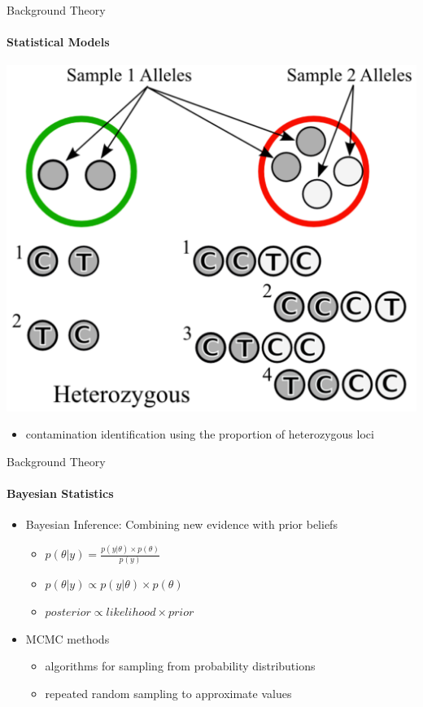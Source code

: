 \documentclass[letter,graphicx]{beamer}
\begin{document}
\begin{frame}{Background Theory}
\framesubtitle{Statistical Models}
  \begin{center}
   \includegraphics[width=.6\textwidth]{images/hetero_figure2}
  \end{center}
   \begin{itemize}
   	\item contamination identification using the proportion of heterozygous loci
   \end{itemize}
\end{frame}

\begin{frame}{Background Theory}
\framesubtitle{Bayesian Statistics}
\begin{itemize}
\item Bayesian Inference: Combining new evidence with prior beliefs
	\vspace{1mm}
	\begin{itemize}
	\item $p(\theta|y) = \frac{p(y|\theta) \times p(\theta)}{p(y)}$
	\vspace{2mm}
	\item $p(\theta|y) \propto p(y|\theta) \times p(\theta)$
	\vspace{2mm}
	\item $posterior \propto likelihood \times prior$
	\end{itemize}
	\vspace{2mm}
\item MCMC methods
	\vspace{1mm}
	\begin{itemize}
	\item algorithms for sampling from probability distributions
	\vspace{2mm}
	\item repeated random sampling to approximate values
	\end{itemize}
\end{itemize}
\end{frame}
\end{document}
